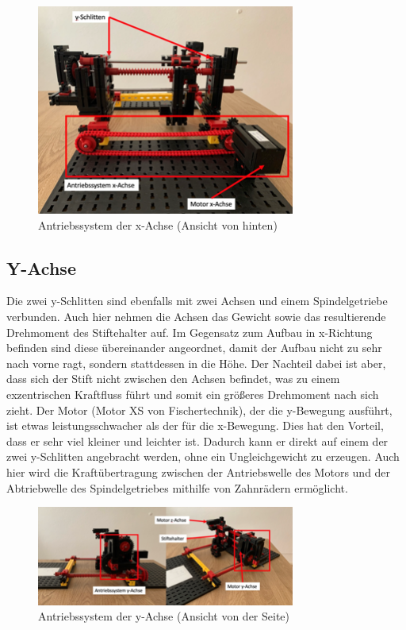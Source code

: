 \documentclass[conference,compsoc,final,a4paper]{IEEEtran}
\begin{document}
\begin{figure}[h]
\centering
\includegraphics[width=8.5cm]{../images/xAchse.png}
\caption{Antriebssystem der x-Achse (Ansicht von hinten)}
\label{Mechanik:Aufbau}
\end{figure}

\subsection{Y-Achse}

Die zwei y-Schlitten sind ebenfalls mit zwei Achsen und einem Spindelgetriebe verbunden. Auch hier nehmen die Achsen das Gewicht
sowie das resultierende Drehmoment des Stiftehalter auf. Im Gegensatz zum Aufbau in x-Richtung befinden sind diese übereinander angeordnet,
damit der Aufbau nicht zu sehr nach vorne ragt, sondern stattdessen in die Höhe. Der Nachteil dabei ist aber, dass sich der Stift nicht
zwischen den Achsen befindet, was zu einem exzentrischen Kraftfluss führt und somit ein größeres Drehmoment nach sich zieht. 
Der Motor (Motor XS von Fischertechnik), der die y-Bewegung ausführt, ist etwas leistungsschwacher als der für die x-Bewegung. Dies hat
den Vorteil, dass er sehr viel kleiner und leichter ist. Dadurch kann er direkt auf einem der zwei y-Schlitten angebracht werden, ohne
ein Ungleichgewicht zu erzeugen. Auch hier wird die Kraftübertragung zwischen der Antriebswelle des Motors und der Abtriebwelle des
Spindelgetriebes mithilfe von Zahnrädern ermöglicht. 

\begin{figure}[h]
\centering
\includegraphics[width=8.5cm]{../images/yAchse.png}
\caption{Antriebssystem der y-Achse (Ansicht von der Seite)}
\label{Mechanik:Aufbau}
\end{figure}
\end{document}
